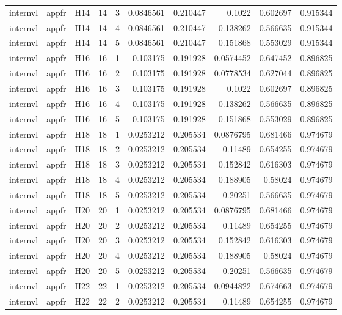 \begin{longtable}{lllrrrrrrr}
internvl & appfr & H14 & 14 & 3 & 0.0846561 & 0.210447 & 0.1022 & 0.602697 & 0.915344 \\
internvl & appfr & H14 & 14 & 4 & 0.0846561 & 0.210447 & 0.138262 & 0.566635 & 0.915344 \\
internvl & appfr & H14 & 14 & 5 & 0.0846561 & 0.210447 & 0.151868 & 0.553029 & 0.915344 \\
internvl & appfr & H16 & 16 & 1 & 0.103175 & 0.191928 & 0.0574452 & 0.647452 & 0.896825 \\
internvl & appfr & H16 & 16 & 2 & 0.103175 & 0.191928 & 0.0778534 & 0.627044 & 0.896825 \\
internvl & appfr & H16 & 16 & 3 & 0.103175 & 0.191928 & 0.1022 & 0.602697 & 0.896825 \\
internvl & appfr & H16 & 16 & 4 & 0.103175 & 0.191928 & 0.138262 & 0.566635 & 0.896825 \\
internvl & appfr & H16 & 16 & 5 & 0.103175 & 0.191928 & 0.151868 & 0.553029 & 0.896825 \\
internvl & appfr & H18 & 18 & 1 & 0.0253212 & 0.205534 & 0.0876795 & 0.681466 & 0.974679 \\
internvl & appfr & H18 & 18 & 2 & 0.0253212 & 0.205534 & 0.11489 & 0.654255 & 0.974679 \\
internvl & appfr & H18 & 18 & 3 & 0.0253212 & 0.205534 & 0.152842 & 0.616303 & 0.974679 \\
internvl & appfr & H18 & 18 & 4 & 0.0253212 & 0.205534 & 0.188905 & 0.58024 & 0.974679 \\
internvl & appfr & H18 & 18 & 5 & 0.0253212 & 0.205534 & 0.20251 & 0.566635 & 0.974679 \\
internvl & appfr & H20 & 20 & 1 & 0.0253212 & 0.205534 & 0.0876795 & 0.681466 & 0.974679 \\
internvl & appfr & H20 & 20 & 2 & 0.0253212 & 0.205534 & 0.11489 & 0.654255 & 0.974679 \\
internvl & appfr & H20 & 20 & 3 & 0.0253212 & 0.205534 & 0.152842 & 0.616303 & 0.974679 \\
internvl & appfr & H20 & 20 & 4 & 0.0253212 & 0.205534 & 0.188905 & 0.58024 & 0.974679 \\
internvl & appfr & H20 & 20 & 5 & 0.0253212 & 0.205534 & 0.20251 & 0.566635 & 0.974679 \\
internvl & appfr & H22 & 22 & 1 & 0.0253212 & 0.205534 & 0.0944822 & 0.674663 & 0.974679 \\
internvl & appfr & H22 & 22 & 2 & 0.0253212 & 0.205534 & 0.11489 & 0.654255 & 0.974679 \\

\end{longtable}

